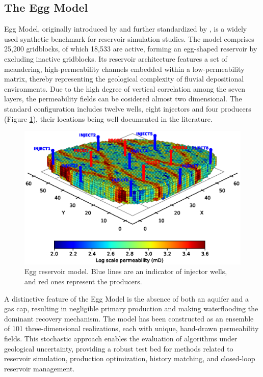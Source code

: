 \documentclass[pdflatex,sn-basic]{sn-jnl}%
\theoremstyle{thmstyleone}%
\theoremstyle{thmstyletwo}%
\theoremstyle{thmstylethree}%
\begin{document}
\subsection{The Egg Model}\label{subsec41}

Egg Model, originally introduced by \cite{ref23} and further standardized by \cite{ref18}, is a widely used synthetic benchmark for reservoir simulation studies. The model comprises 25,200 gridblocks, of which 18,533 are active, forming an egg-shaped reservoir by excluding inactive gridblocks. Its reservoir architecture features a set of meandering, high-permeability channels embedded within a low-permeability matrix, thereby representing the geological complexity of fluvial depositional environments. Due to the high degree of vertical correlation among the seven layers, the permeability fields can be cosidered almost two dimensional. The standard configuration includes twelve wells, eight injectors and four producers (Figure \ref{fig3}), their locations being well documented in the literature.

\begin{figure}[H]
\centering
\begin{minipage}{0.95\textwidth}
  \includegraphics[width=\textwidth]{egg_model_log_3D_well.eps}
  \caption{Egg reservoir model. Blue lines are an indicator of injector wells, and red ones represent the producers.}
  \label{fig3}
\end{minipage}
\end{figure}

A distinctive feature of the Egg Model is the absence of both an aquifer and a gas cap, resulting in negligible primary production and making waterflooding the dominant recovery mechanism. The model has been constructed as an ensemble of 101 three-dimensional realizations, each with unique, hand-drawn permeability fields. This stochastic approach enables the evaluation of algorithms under geological uncertainty, providing a robust test bed for methods related to reservoir simulation, production optimization, history matching, and closed-loop reservoir management.
\end{document}
